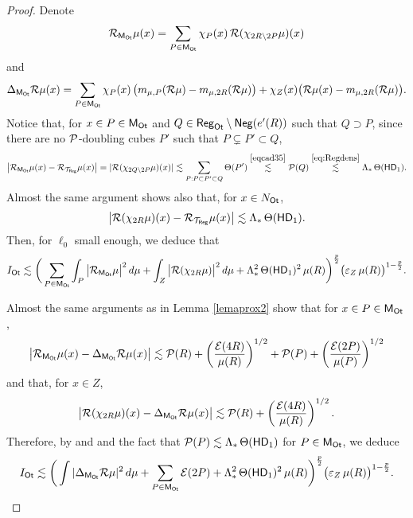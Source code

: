 \begin{proof}
Denote
$${\mathcal R}_{{\mathsf{M}}_{\mathsf{Ot}}}\mu(x) = \sum_{P\in{\mathsf{M}}_{\mathsf{Ot}}} \chi_P(x)\,{\mathcal R}(\chi_{2R\setminus 2P}\mu)(x)$$
and
$$\Delta_{{\mathsf{M}}_{\mathsf{Ot}}}{\mathcal R}\mu(x) =
\sum_{P\in{\mathsf{M}}_{\mathsf{Ot}}} \chi_P(x)\,\big(m_{\mu,P}({\mathcal R}\mu) - m_{\mu,2R}({\mathcal R}\mu)\big)
+ \chi_{Z}(x) \big({\mathcal R}\mu(x) -  m_{\mu,2R}({\mathcal R}\mu)\big)
.$$
Notice that, for $x\in P\in{\mathsf{M}}_{\mathsf{Ot}}$ and $Q\in {\mathsf{Reg}}_{\mathsf{Ot}}\setminus {\mathsf{Neg}}(e'(R))$ such that $Q\supset P$, since there are no ${\mathcal P}$-doubling cubes $P'$ such that $P\subsetneq P'\subset Q$,
$$\big|{\mathcal R}_{{\mathsf{M}}_{\mathsf{Ot}}}\mu(x) - {\mathcal R}_{{\mathcal T}_{\mathsf{Reg}}}\mu(x)\big| = |
{\mathcal R}(\chi_{2 Q\setminus 2P}\mu)(x)|\lesssim \sum_{P: P\subset P'\subset Q} \Theta(P') \overset{\eqref{eqcad35}}{\lesssim} {\mathcal P}(Q)\overset{\eqref{eq:Regdens}}{\lesssim}
\Lambda_*\,\Theta({\mathsf{HD}}_1).$$
Almost the same argument shows also that, for $x\in N_{\mathsf{Ot}}$,
$$\big|{\mathcal R}(\chi_{2R}\mu)(x) - {\mathcal R}_{{\mathcal T}_{\mathsf{Reg}}}\mu(x)\big| \lesssim
\Lambda_*\,\Theta({\mathsf{HD}}_1).$$
Then, for $\ell_0$ small enough, we deduce that
$$I_{\mathsf{Ot}} \lesssim \bigg(\sum_{P\in{\mathsf{M}}_{{\mathsf{Ot}}}} \int_P \big|{\mathcal R}_{{\mathsf{M}}_{\mathsf{Ot}}}\mu\big|^{2}\,d\mu + \int_Z \big|{\mathcal R}(\chi_{2R}\mu)\big|^{2}\,d\mu + \Lambda_*^2\,\Theta({\mathsf{HD}}_1)^2\,\mu(R)
\bigg)^{\frac p2} \big({\varepsilon}_Z\,\mu(R)\big)^{1-\frac p2}.$$ 


Almost the same arguments as in Lemma \ref{lemaprox2} show that for $x\in P\in{\mathsf{M}}_{\mathsf{Ot}}$,
$$\big|{\mathcal R}_{{\mathsf{M}}_{\mathsf{Ot}}}\mu(x) - \Delta_{{\mathsf{M}}_{\mathsf{Ot}}}{\mathcal R}\mu(x)\big| \lesssim {\mathcal P}(R) + \left(\frac{{\mathcal E}(4R)}{\mu(R)}\right)^{1/2} + {\mathcal P}(P) +  \left(\frac{{\mathcal E}(2P)}{\mu(P)}\right)^{1/2}$$
and that, for $x\in Z$,
$$\big|{\mathcal R}(\chi_{2R}\mu)(x) - \Delta_{{\mathsf{M}}_{\mathsf{Ot}}}{\mathcal R}\mu(x)\big| \lesssim {\mathcal P}(R) + \left(\frac{{\mathcal E}(4R)}{\mu(R)}\right)^{1/2}.$$
Therefore, by  and  and the fact that ${\mathcal P}(P)\lesssim\Lambda_*\,\Theta({\mathsf{HD}}_1)$ for 
$P\in{\mathsf{M}}_{\mathsf{Ot}}$, we deduce
$$I_{\mathsf{Ot}} \lesssim \bigg(\int |\Delta_{{\mathsf{M}}_{\mathsf{Ot}}}{\mathcal R}\mu|^2\,d\mu +
\sum_{P\in{\mathsf{M}}_{{\mathsf{Ot}}}} {\mathcal E}(2P) + \Lambda_*^2\,\Theta({\mathsf{HD}}_1)^2\,\mu(R)
\bigg)^{\frac p2} \big({\varepsilon}_Z\,\mu(R)\big)^{1-\frac p2}.$$ 


\end{proof}
